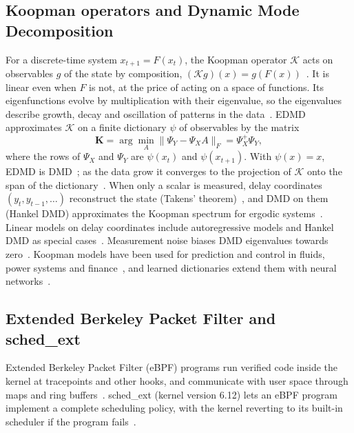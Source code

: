 \documentclass[conference,onecolumn,11pt]{IEEEtran}
\newcommand{\K}{\mathbf{K}}
\begin{document}
\subsection{Koopman operators and Dynamic Mode Decomposition}
For a discrete-time system $x_{t+1}=F(x_t)$, the Koopman operator $\mathcal{K}$ acts on observables $g$ of the state by composition, $(\mathcal{K}g)(x)=g(F(x))$~\cite{koopman1931}. It is linear even when $F$ is not, at the price of acting on a space of functions. Its eigenfunctions evolve by multiplication with their eigenvalue, so the eigenvalues describe growth, decay and oscillation of patterns in the data~\cite{mezic2005}. EDMD~\cite{williams2015} approximates $\mathcal{K}$ on a finite dictionary $\psi$ of observables by the matrix
\begin{equation}
\K=\arg\min_A\|\Psi_Y-\Psi_XA\|_F=\Psi_X^{+}\Psi_Y ,
\end{equation}
where the rows of $\Psi_X$ and $\Psi_Y$ are $\psi(x_t)$ and $\psi(x_{t+1})$. With $\psi(x)=x$, EDMD is DMD~\cite{schmid2010,tu2014}; as the data grow it converges to the projection of $\mathcal{K}$ onto the span of the dictionary~\cite{korda2018}. When only a scalar is measured, delay coordinates $(y_t,y_{t-1},\dots)$ reconstruct the state (Takens' theorem)~\cite{takens1981}, and DMD on them (Hankel DMD) approximates the Koopman spectrum for ergodic systems~\cite{arbabi2017}. Linear models on delay coordinates include autoregressive models and Hankel DMD as special cases~\cite{pan2020,brunton2017havok}. Measurement noise biases DMD eigenvalues towards zero~\cite{dawson2016}. Koopman models have been used for prediction and control in fluids, power systems and finance~\cite{kutz2016,mann2016,kordampc2018}, and learned dictionaries extend them with neural networks~\cite{lusch2018}.

\subsection{Extended Berkeley Packet Filter and sched\_ext}
Extended Berkeley Packet Filter (eBPF) programs run verified code inside the kernel at tracepoints and other hooks, and communicate with user space through maps and ring buffers~\cite{gregg2019}. sched\_ext (kernel version 6.12) lets an eBPF program implement a complete scheduling policy, with the kernel reverting to its built-in scheduler if the program fails~\cite{schedext}.

\end{document}
